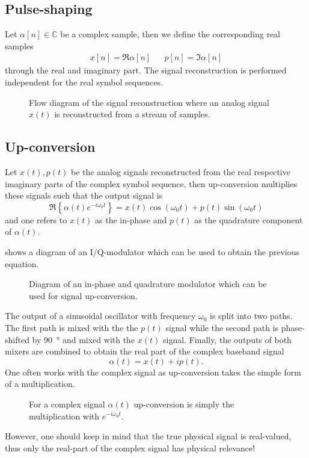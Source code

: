 \subsection{Pulse-shaping}

Let $\alpha[n]\in\mathbb{C}$ be a complex sample, then we define the corresponding real samples
\begin{align}
	x[n]=\Re{\alpha[n]}
	&&
	p[n]=\Im{\alpha[n]}
\end{align}
through the real and imaginary part.
The signal reconstruction is performed independent for the real symbol sequences.
\begin{figure}[htb]
	\centering
	
	\caption{Flow diagram of the signal reconstruction where an analog signal $x(t)$ is reconstructed from a stream of samples.}\label{fig:transmitter}
\end{figure}


\subsection{Up-conversion}

Let $x(t),p(t)$ be the analog signals reconstructed from the real respective imaginary parts of the complex symbol sequence, then up-conversion multiplies these signals such that the output signal is~\cite[p.~25]{Madhow2008}
\begin{equation}
	\Re\left\{
		\alpha(t)
		e^{-i\omega_0t}
	\right\}
	=
	x(t)
	\cos(\omega_0t)
	+
	p(t)
	\sin(\omega_0t)
\end{equation}
and one refers to $x(t)$ as the in-phase and $p(t)$ as the quadrature component of $\alpha(t)$.

 shows a diagram of an I/Q-modulator which can be used to obtain the previous equation.
\begin{figure}[htb]
	\centering
	
	\caption{Diagram of an in-phase and quadrature modulator which can be used for signal up-conversion.}\label{fig:iqmod}
\end{figure}
The output of a sinusoidal oscillator with frequency $\omega_0$ is split into two paths.
The first path is mixed with the the $p(t)$ signal while the second path is phase-shifted by \SI{90}{\degree} and mixed with the $x(t)$ signal.
Finally, the outputs of both mixers are combined to obtain the real part of the complex baseband signal
\begin{equation}
	\alpha(t)
	=
	x(t)
	+
	ip(t)
	.
\end{equation}
One often works with the complex signal as up-conversion takes the simple form of a multiplication.
\begin{figure}[htb]
	\centering
	
	\caption{For a complex signal $\alpha(t)$ up-conversion is simply the multiplication with $e^{-i\omega_0t}$.}
\end{figure}
However, one should keep in mind that the true physical signal is real-valued, thus only the real-part of the complex signal has physical relevance!

